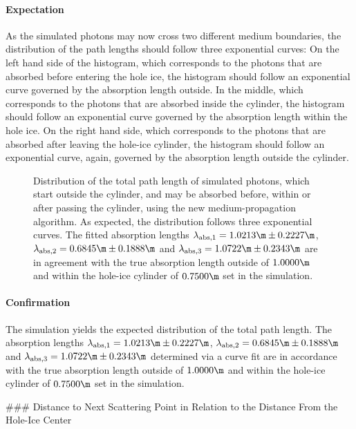 \paragraph{Expectation} As the simulated photons may now cross two different medium boundaries, the distribution of the path lengths should follow three exponential curves: On the left hand side of the histogram, which corresponds to the photons that are absorbed before entering the hole ice, the histogram should follow an exponential curve governed by the absorption length outside. In the middle, which corresponds to the photons that are absorbed inside the cylinder, the histogram should follow an exponential curve governed by the absorption length within the hole ice. On the right hand side, which corresponds to the photons that are absorbed after leaving the hole-ice cylinder, the histogram should follow an exponential curve, again, governed by the absorption length outside the cylinder.

\begin{figure}
  \caption{Distribution of the total path length of simulated photons, which start outside the cylinder, and may be absorbed before, within or after passing the cylinder, using the new medium-propagation algorithm. As expected, the distribution follows three exponential curves. The fitted absorption lengths $\lambda_\text{abs,1} = 1.0213\m \pm 0.2227\m$, $\lambda_\text{abs,2} = 0.6845\m \pm 0.1888\m$ and $\lambda_\text{abs,3} = 1.0722\m \pm 0.2343\m$ are in agreement with the true absorption length outside of $1.0000\m$ and within the hole-ice cylinder of $0.7500\m$ set in the simulation.}
\end{figure}

\paragraph{Confirmation} The simulation yields the expected distribution of the total path length. The absorption lengths $\lambda_\text{abs,1} = 1.0213\m \pm 0.2227\m$, $\lambda_\text{abs,2} = 0.6845\m \pm 0.1888\m$ and $\lambda_\text{abs,3} = 1.0722\m \pm 0.2343\m$ determined via a curve fit are in accordance with the true absorption length outside of $1.0000\m$ and within the hole-ice cylinder of $0.7500\m$ set in the simulation.

### Distance to Next Scattering Point in Relation to the Distance From the Hole-Ice Center


